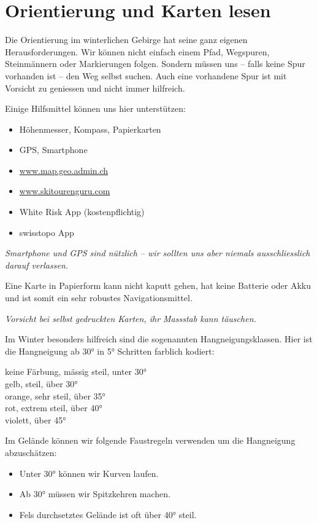 \section{Orientierung und Karten lesen}

Die Orientierung im winterlichen Gebirge hat seine ganz eigenen Herausforderungen.
Wir können nicht einfach einem Pfad, Wegspuren, Steinmännern oder Markierungen folgen.
Sondern müssen uns -- falls keine Spur vorhanden ist -- den Weg selbst suchen.
Auch eine vorhandene Spur ist mit Vorsicht zu geniessen und nicht immer hilfreich.

Einige Hilfsmittel können uns hier unterstützen:

\begin{itemize}
  \item{Höhenmesser, Kompass, Papierkarten}
  \item{GPS, Smartphone}
  \item{\href{https://s.geo.admin.ch/y34y7btkqsvz}{www.map.geo.admin.ch}}
  \item{\href{https://www.skitourenguru.com//}{www.skitourenguru.com}}
  \item{White Risk App (kostenpflichtig)}
  \item{swisstopo App}
\end{itemize}

\textit{Smartphone und GPS sind nützlich -- wir sollten uns aber niemals ausschliesslich darauf verlassen.}

Eine Karte in Papierform kann nicht kaputt gehen, hat keine Batterie oder Akku und ist somit ein sehr robustes Navigationsmittel.

\textit{Vorsicht bei selbst gedruckten Karten, ihr Massstab kann täuschen.}

Im Winter besonders hilfreich sind die sogenannten Hangneigungsklassen.
Hier ist die Hangneigung ab 30° in 5° Schritten farblich kodiert:

\cbox[white]{10pt} keine Färbung, mässig steil, unter 30°\\
\cbox[above30]{10pt} gelb, steil, über 30°\\
\cbox[above35]{10pt} orange, sehr steil, über 35°\\
\cbox[above40]{10pt} rot, extrem steil, über 40°\\
\cbox[tooSteep]{10pt} violett, über 45°

Im Gelände können wir folgende Faustregeln verwenden um die Hangneigung abzuschätzen:

\begin{itemize}
  \item{Unter 30° können wir Kurven laufen.}
  \item{Ab 30° müssen wir Spitzkehren machen.}
  \item{Fels durchsetztes Gelände ist oft über 40° steil.}
\end{itemize}

